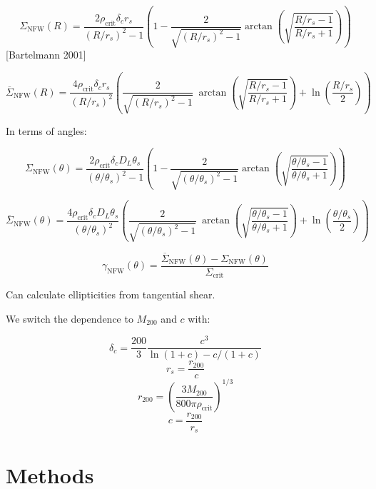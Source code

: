 \documentclass[10pt]{article}
\begin{document}
\[\Sigma_\mathrm{NFW}(R) = \frac{2 \rho_\mathrm{crit} \delta_c r_s}{(R/r_s)^2 - 1} \left(1 - \frac{2}{\sqrt{(R/r_s)^2 - 1}}  \arctan\left(\sqrt{\frac{R/r_s - 1}{R/r_s + 1}} \right) \right)\]
[Bartelmann 2001]

\[\overline{\Sigma}_\mathrm{NFW}(R) = \frac{4 \rho_\mathrm{crit} \delta_c r_s}{(R/r_s)^2} \left(
    \frac{2}{\sqrt{(R/r_s)^2 - 1}} ~\arctan\left(\sqrt{\frac{R/r_s - 1}{R/r_s + 1}} \right) + \ln{\left(\frac{R/r_s}{2}\right)}
\right)\]

In terms of angles:

\[\Sigma_\mathrm{NFW}(\theta) = \frac{2 \rho_\mathrm{crit} \delta_c D_L \theta_s}{(\theta/\theta_s)^2 - 1} \left(1 - \frac{2}{\sqrt{(\theta/\theta_s)^2 - 1}} \arctan\left(\sqrt{\frac{\theta/\theta_s - 1}{\theta/\theta_s + 1}} \right) \right)\]

\[\overline{\Sigma}_\mathrm{NFW}(\theta) = \frac{4 \rho_\mathrm{crit} \delta_c D_L \theta_s}{(\theta/\theta_s)^2} \left(
    \frac{2}{\sqrt{(\theta/\theta_s)^2 - 1}} ~\arctan\left(\sqrt{\frac{\theta/\theta_s - 1}{\theta/\theta_s + 1}} \right) + \ln{\left(\frac{\theta/\theta_s}{2}\right)}
\right)\]

\[\gamma_\mathrm{NFW}(\theta) = \frac{\overline{\Sigma}_\mathrm{NFW}(\theta) - \Sigma_\mathrm{NFW}(\theta)}{\Sigma_\mathrm{crit}} \]

Can calculate ellipticities from tangential shear.

We switch the dependence to $M_{200}$ and $c$ with:

\[\delta_c = \frac{200}{3} \frac{c^3}{\ln(1 + c) - c/(1 + c)}\]
\[r_s = \frac{r_{200}}{c}\]
\[r_{200} = \left( \frac{3 M_{200}}{800 \pi \rho_\mathrm{crit}} \right)^{1/3}\]
\[c = \frac{r_{200}}{r_s}\]


\section{Methods}
\end{document}
